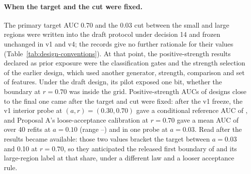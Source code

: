 \paragraph{When the target and the cut were fixed.}
The primary target AUC 0.70 and the 0.03 cut between the small and large regions were written into the draft protocol under decision 14 and frozen unchanged in v1 and v4; the records give no further rationale for their values (Table~\ref{tab:design-conventions}). At that point, the positive-strength results declared as prior exposure were the classification gates and the strength selection of the earlier design, which used another generator, strength, comparison and set of features. Under the draft design, its pilot exposed one bit, whether the boundary at $r=0.70$ was inside the grid. Positive-strength AUCs of designs close to the final one came after the target and cut were fixed: after the v1 freeze, the v1 interior probe at $(a,r)=(0.30,0.70)$ gave a conditional reference AUC of , and Proposal A's loose-acceptance calibration at $r=0.70$ gave a mean AUC of  over 40 refits at $a=0.10$ (range --) and  in one probe at $a=0.03$. Read after the results became available: those two values bracket the target between $a=0.03$ and 0.10 at $r=0.70$, so they anticipated the released first boundary of  and its large-region label at that share, under a different law and a looser acceptance rule. %


